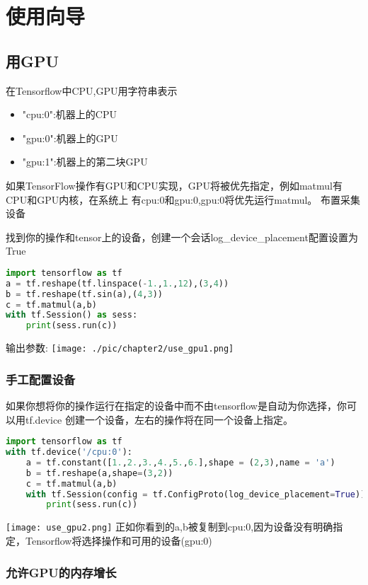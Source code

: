 \chapter{使用向导}
\section{用GPU}
在Tensorflow中CPU,GPU用字符串表示
\begin{itemize}
\item "cpu:0":机器上的CPU
\item "gpu:0":机器上的GPU
\item "gpu:1":机器上的第二块GPU
\end{itemize}
 如果TensorFlow操作有GPU和CPU实现，GPU将被优先指定，例如matmul有CPU和GPU内核，在系统上 有cpu:0和gpu:0,gpu:0将优先运行matmul。
布置采集设备

找到你的操作和tensor上的设备，创建一个会话log\_device\_placement配置设置为True
\begin{lstlisting}[language=Python]
import tensorflow as tf
a = tf.reshape(tf.linspace(-1.,1.,12),(3,4))
b = tf.reshape(tf.sin(a),(4,3))
c = tf.matmul(a,b)
with tf.Session() as sess:
    print(sess.run(c))
\end{lstlisting}
输出参数:\newline
\texttt{[image: ./pic/chapter2/use\_gpu1.png]}\newline
\subsection{手工配置设备}
如果你想将你的操作运行在指定的设备中而不由tensorflow是自动为你选择，你可以用tf.device 创建一个设备，左右的操作将在同一个设备上指定。
\begin{lstlisting}[language=Python]
import tensorflow as tf
with tf.device('/cpu:0'):
    a = tf.constant([1.,2.,3.,4.,5.,6.],shape = (2,3),name = 'a')
    b = tf.reshape(a,shape=(3,2))
    c = tf.matmul(a,b)
    with tf.Session(config = tf.ConfigProto(log_device_placement=True)) as sess:
        print(sess.run(c))
\end{lstlisting}
\texttt{[image: use\_gpu2.png]}\newline
正如你看到的a,b被复制到cpu:0,因为设备没有明确指定，Tensorflow将选择操作和可用的设备(gpu:0)

\subsection{允许GPU的内存增长}

